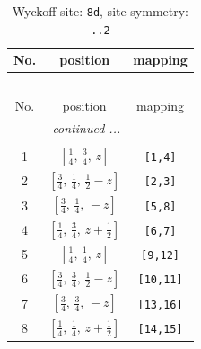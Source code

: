 \documentclass[fleqn,8pt]{jsarticle}
\begin{document}
\begin{longtable}{ccc}
\caption{Wyckoff site: {\tt 8d}, site symmetry: {\tt ..2}}
 \\
 \hline \hline
No. & position & mapping \\ \hline \endfirsthead

\multicolumn{2}{l}{\tablename\ \thetable{}} \\
 \hline \hline
No. & position & mapping \\ \hline \endhead

 \hline \hline
\multicolumn{2}{r}{\footnotesize\it continued ...} \\ \endfoot

 \hline \hline
\multicolumn{2}{r}{} \\ \endlastfoot

1 & $\left[ \frac{1}{4},\, \frac{3}{4},\, z \right]$ & {\tt [1,4]} \\ \hline
2 & $\left[ \frac{3}{4},\, \frac{1}{4},\, \frac{1}{2} - z \right]$ & {\tt [2,3]} \\ \hline
3 & $\left[ \frac{3}{4},\, \frac{1}{4},\, - z \right]$ & {\tt [5,8]} \\ \hline
4 & $\left[ \frac{1}{4},\, \frac{3}{4},\, z + \frac{1}{2} \right]$ & {\tt [6,7]} \\ \hline
5 & $\left[ \frac{1}{4},\, \frac{1}{4},\, z \right]$ & {\tt [9,12]} \\ \hline
6 & $\left[ \frac{3}{4},\, \frac{3}{4},\, \frac{1}{2} - z \right]$ & {\tt [10,11]} \\ \hline
7 & $\left[ \frac{3}{4},\, \frac{3}{4},\, - z \right]$ & {\tt [13,16]} \\ \hline
8 & $\left[ \frac{1}{4},\, \frac{1}{4},\, z + \frac{1}{2} \right]$ & {\tt [14,15]} \\
\end{longtable}
\renewcommand{\arraystretch}{1.2}
\end{document}

